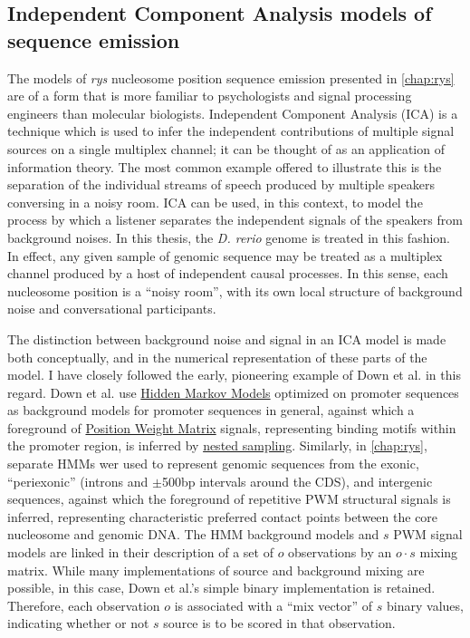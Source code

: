 \subsection{Independent Component Analysis models of sequence emission}
\label{ssec:ICA}
The models of \textit{rys} nucleosome position sequence emission presented in \autoref{chap:rys} are of a form that is more familiar to psychologists and signal processing engineers than molecular biologists. Independent Component Analysis (ICA) is a technique which is used to infer the independent contributions of multiple signal sources on a single multiplex channel; it can be thought of as an application of information theory. The most common example offered to illustrate this is the separation of the individual streams of speech produced by multiple speakers conversing in a noisy room. ICA can be used, in this context, to model the process by which a listener separates the independent signals of the speakers from background noises. In this thesis, the \textit{D. rerio} genome is treated in this fashion. In effect, any given sample of genomic sequence may be treated as a multiplex channel produced by a host of independent causal processes. In this sense, each nucleosome position is a ``noisy room'', with its own local structure of background noise and conversational participants. 

The distinction between background noise and signal in an ICA model is made both conceptually, and in the numerical representation of these parts of the model. I have closely followed the early, pioneering example of Down et al. \cite{Down2005} in this regard. Down et al. use \hyperref[ssec:HMM]{Hidden Markov Models} optimized on promoter sequences as background models for promoter sequences in general, against which a foreground of \hyperref[ssec:PWM]{Position Weight Matrix} signals, representing binding motifs within the promoter region, is inferred by \hyperref[ssec:nested]{nested sampling}. Similarly, in \autoref{chap:rys}, separate HMMs wer used to represent genomic sequences from the exonic, ``periexonic'' (introns and $\pm$500bp intervals around the CDS), and intergenic sequences, against which the foreground of repetitive PWM structural signals is inferred, representing characteristic preferred contact points between the core nucleosome and genomic DNA. The HMM background models and $s$ PWM signal models are linked in their description of a set of $o$ observations by an $o \cdot s$ mixing matrix. While many implementations of source and background mixing are possible, in this case, Down et al.'s simple binary implementation is retained. Therefore, each observation $o$ is associated with a ``mix vector'' of $s$ binary values, indicating whether or not $s$ source is to be scored in that observation.

